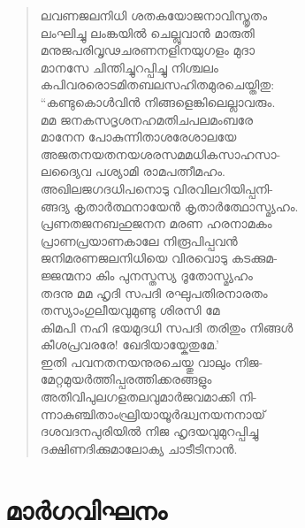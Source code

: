 \begin{verse}
ലവണജലനിധി ശതകയോജനാവിസ്തൃതം\\
ലംഘിച്ചു ലംങ്കയില്‍ ചെല്ലുവാന്‍ മാരുതി\\
മനുജപരിവൃഢചരണനളിനയുഗളം മുദാ\\
മാനസേ ചിന്തിച്ചുറപ്പിച്ചു നിശ്ചലം\\
കപിവരരൊടമിതബലസഹിതമുരചെയ്തിതു:\\
“കണ്ടുകൊള്‍വിന്‍ നിങ്ങളെങ്കിലെല്ലാവരും.\\
മമ ജനകസദൃശനഹമതിചപലമംബരേ\\
മാനേന പോകുന്നിതാശരേശാലയേ\\
അജതനയതനയശരസമമധികസാഹസാ-\\
ലദ്യൈവ പശ്യാമി രാമപത്നീമഹം.\\
അഖിലജഗദധിപനൊടു വിരവിലറിയിപ്പനി-\\
ങ്ങദ്യ കൃതാര്‍ത്ഥനായേന്‍ കൃതാര്‍ത്ഥോസ്മ്യഹം.\\
പ്രണതജനബഹുജനന മരണ ഹരനാമകം\\
പ്രാണപ്രയാണകാലേ നിരൂപിപ്പവന്‍\\
ജനിമരണജലനിധിയെ വിരവൊടു കടക്കുമ-\\
ജ്ജന്മനാ കിം പുനസ്തസ്യ ദൂതോസ്മ്യഹം\\
തദനു മമ ഹൃദി സപദി രഘുപതിരനാരതം\\
തസ്യാംഗുലീയവുമുണ്ടു ശിരസി മേ\\
കിമപി നഹി ഭയമുദധി സപദി തരിതും നിങ്ങള്‍\\
കീശപ്രവരരേ! ഖേദിയായ്കേതുമേ.’\\
ഇതി പവനതനയനുരചെയ്തു വാലും നിജ-\\
മേറ്റമുയര്‍ത്തിപ്പരത്തിക്കരങ്ങളും\\
അതിവിപുലഗളതലവുമാര്‍ജവമാക്കി നി-\\
ന്നാകുഞ്ചിതാംഘ്രിയായൂര്‍ദ്ധ്വനയനനായ്\\
ദശവദനപുരിയില്‍ നിജ ഹൃദയവുമുറപ്പിച്ചു\\
ദക്ഷിണദിക്കുമാലോക്യ ചാടീടിനാന്‍.
\end{verse}


\section{മാര്‍ഗവിഘനം}

